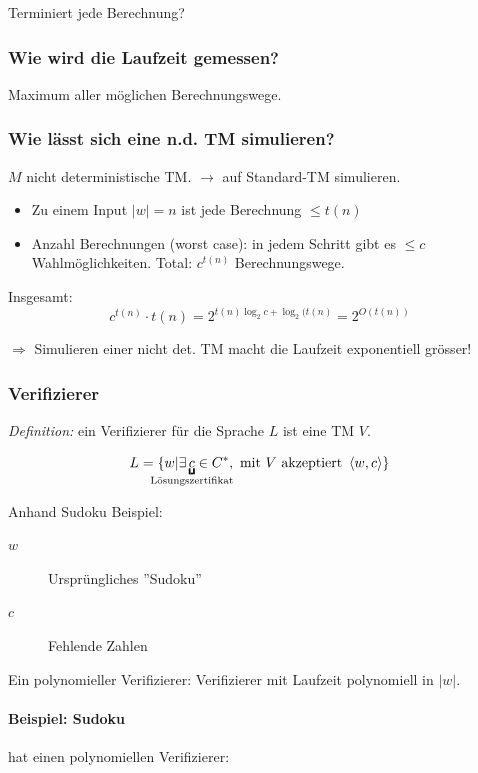 Terminiert jede Berechnung?


\subsubsection{Wie wird die Laufzeit gemessen?}

Maximum aller möglichen Berechnungswege.

\subsubsection{Wie lässt sich eine n.d. TM simulieren?}

$M$ nicht deterministische TM. $\longrightarrow$ auf Standard-TM simulieren.


\begin{itemize}
	\item Zu einem Input $|w| = n$ ist jede Berechnung $\leq t(n)$
	\item Anzahl Berechnungen (worst case): in jedem Schritt gibt es $\leq c$ Wahlmöglichkeiten. Total: $c^{t(n)}$ Berechnungswege.
\end{itemize}

Insgesamt: \[
	c^{t(n)} \cdot t(n) = 2^{t(n) \log_2 c + \log_2(t(n)} = 2^{O(t(n))}
\]

$\Rightarrow$ Simulieren einer nicht det. TM macht die Laufzeit exponentiell grösser!

\subsubsection{Verifizierer}

\emph{Definition:} ein Verifizierer für die Sprache $L$ ist eine TM $V$.

\[
	L = \{ w | \exists \underbracket{c}_{\mathclap{\text{Lösungszertifikat}}} \in C^\ast, \text{ mit } V \text{ akzeptiert } \left< w,c \right> \}
\]

Anhand Sudoku Beispiel:
\begin{description}
\item[$w$] Ursprüngliches ''Sudoku''
\item[$c$] Fehlende Zahlen
\end{description}

Ein polynomieller Verifizierer: Verifizierer mit Laufzeit polynomiell in $|w|$.

\paragraph{Beispiel: Sudoku} hat einen polynomiellen Verifizierer:


